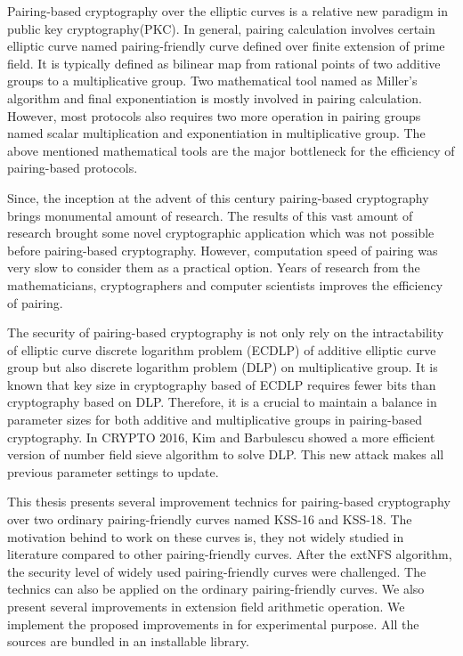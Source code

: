 Pairing-based cryptography over the elliptic curves is a relative new paradigm in public key cryptography(PKC). 
In general, pairing calculation involves certain elliptic curve named pairing-friendly curve defined over finite extension of prime field.
It is typically defined as bilinear map from rational points of two additive groups to a multiplicative group.
Two mathematical tool named as Miller's algorithm and final exponentiation is mostly involved in pairing calculation.
However, most protocols also requires two more operation in pairing groups named scalar multiplication and exponentiation in multiplicative group.
The above mentioned mathematical tools are the major bottleneck for the efficiency of pairing-based protocols.

Since, the inception at the advent of this century pairing-based cryptography brings monumental amount of research. 
The results of this vast amount of research brought some novel cryptographic application which was not possible before pairing-based cryptography. 
However, computation speed of pairing was very slow to consider them as a practical option.
Years of research from the mathematicians, cryptographers and computer scientists improves the efficiency of pairing.

The security of pairing-based cryptography is not only rely on the intractability of elliptic curve discrete logarithm problem (ECDLP) of additive elliptic curve group but also  discrete logarithm problem (DLP) on multiplicative group.
It is known that key size in cryptography based of ECDLP requires fewer bits than cryptography based on DLP.
Therefore, it is a crucial to maintain a balance in parameter sizes for both additive and multiplicative groups in pairing-based cryptography.
In CRYPTO 2016, Kim and Barbulescu showed a more efficient version of number field sieve algorithm to solve DLP. 
This new attack makes all previous parameter settings to update.

This thesis presents several improvement technics for pairing-based cryptography over two ordinary pairing-friendly curves named KSS-16 and KSS-18.
The motivation behind to work on these curves is, they not widely studied in literature compared to other pairing-friendly curves.
After the extNFS algorithm, the security level of widely used pairing-friendly curves were challenged.
The technics can also be applied on the ordinary pairing-friendly curves.
We also present several improvements in extension field arithmetic operation. 
We implement the proposed improvements in for experimental purpose.
All the sources are bundled in an installable library.
